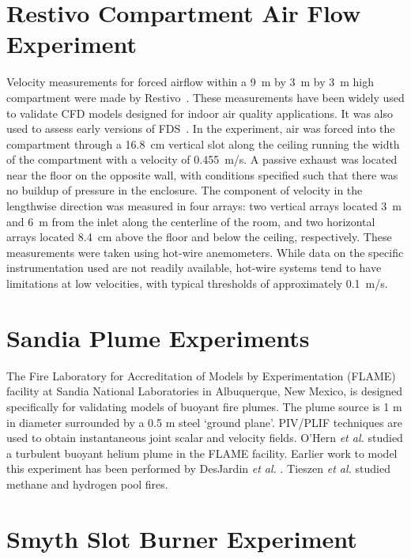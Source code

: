\section{Restivo Compartment Air Flow Experiment}

Velocity measurements for forced airflow within a 9~m by 3~m by 3~m high compartment were made by Restivo~\cite{Restivo:1979}. These measurements
have been widely used to validate CFD models designed for indoor air quality applications. It was also used to assess early versions of
FDS~\cite{Emmerich:1,Emmerich:2,Musser:1}. In the experiment, air was forced into the compartment through a 16.8~cm vertical slot along the ceiling
running the width of the compartment with a velocity of 0.455~m/s. A passive exhaust was located near the floor on the opposite wall, with
conditions specified such that there was no buildup of pressure in the enclosure. The component
of velocity in the lengthwise direction was measured in four arrays: two vertical arrays located 3~m and 6~m  from the inlet along the
centerline of the room, and two horizontal arrays located 8.4~cm above the floor and below the ceiling, respectively.
These measurements were taken using hot-wire anemometers. While data on the specific
instrumentation used are not readily available, hot-wire systems tend to have limitations at low velocities,
with typical thresholds of approximately 0.1~m/s.


\section{Sandia Plume Experiments}

The Fire Laboratory for Accreditation of Models by Experimentation (FLAME) facility \cite{OHern:2005,Blanchat:2001} at Sandia National Laboratories in Albuquerque, New Mexico, is designed specifically for validating models of buoyant fire plumes.  The plume source is 1 m in diameter surrounded by a 0.5 m steel `ground plane'. PIV/PLIF techniques are used to obtain instantaneous joint scalar and velocity fields.  O'Hern {\em et al.} \cite{OHern:2005} studied a turbulent buoyant helium plume in the FLAME facility. Earlier work to model this experiment has been performed by DesJardin {\em et al.} \cite{DesJardin:2004}. Tieszen {\em et al.} \cite{Tieszen:2004,Tieszen:2002} studied methane and hydrogen pool fires.


\section{Smyth Slot Burner Experiment}

